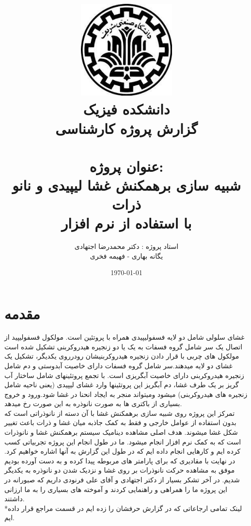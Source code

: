 \documentclass[12pt,onecolumn,a4paper]{report}
\begin{document}
\title{\includegraphics[width=5cm, height= 5cm]{3.jpg}\\\Large{دانشکده فیزیک}\\{\LARGE{گزارش پروژه کارشناسی}}\\{\\{\Huge{عنوان پروژه:}\\\Huge{شبیه سازی برهمکنش غشا لیپیدی و نانو ذرات \\با استفاده از نرم افزار  }}} }
\author{\LARGE{استاد پروژه : دکتر محمدرضا اجتهادی}\\\LARGE{یگانه بهاری - فهیمه فخری}}
\date{\LARGE{\today}}
\maketitle
\tableofcontents

\section{\LARGE{مقدمه} }
\large{غشای سلولی شامل دو لایه فسفولیپیدی همراه با پروتئین است. مولکول فسفولیپید از اتصال یک سر شامل گروه فسفات
به یک یا دو زنجیره هیدروکربنی تشکیل شده است
مولکول های چربی با قرار دادن زنجیره هیدروکربنیشان
رودرروی یکدیگر، تشکیل یک غشای دو لایه میدهند.سر شامل گروه فسفات دارای خاصیت آبدوستی و دم شامل زنجیره هیدروکربنی دارای خاصیت
آبگریزی است. با تجمع پروتئینهای شامل ساختار
آب گریز بر یک طرف غشا، دم آبگریز این پروتئینها وارد غشای لیپیدی (یعنی ناحیه
شامل زنجیره های هیدروکربنی) میشود ومیتواند منجر به ایجاد
انحنا در غشا شود.ورود و خروج بسیاری از باکتری ها به صورت نانوذره به این صورت رخ میدهد.\\
تمرکز این پروژه روی شبیه سازی برهمکنش غشا با آن دسته از نانوذراتی است که بدون استفاده از عوامل خارجی و فقط به کمک جاذبه میان غشا و ذرات باعث تغییر شکل غشا میشوند.
هدف اصلی مشاهده دینامیک سیستم برهمکنش غشا و نانوذرات است که به کمک نرم افزار  انجام میشود.
ما در طول انجام این پروژه تجربیاتی کسب کرده ایم و کارهایی انجام داده ایم که در طول این گزارش به آنها اشاره خواهیم کرد. در نهایت با مقادیری که برای پارامتر های مربوطه پیدا کرده و به دست آورده بودیم موفق به مشاهده حرکت نانوذرات بر روی غشا و نزدیک شدن دو نانوذره به یکدیگر شدیم.
در آخر تشکر بسیار از دکتر اجتهادی و آقای علی فرنودی داریم که صبورانه در این پروژه ما را همراهی و راهنمایی کردند و آموخته های بسیاری را به ما ارزانی داشتند.\\
*لینک تمامی ارجاعاتی که در گزارش حرفشان را زده ایم در قسمت مراجع قرار داده ایم.}
\end{document}
